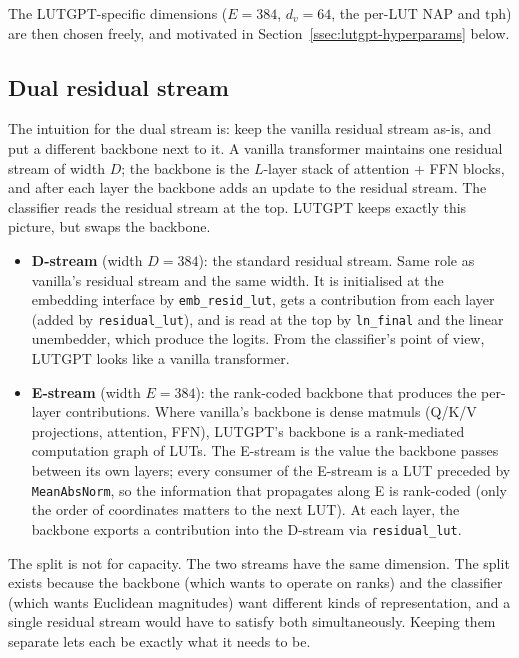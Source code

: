 \documentclass[11pt]{article}
\newcommand{\dv}{d_v}
\begin{document}
The LUTGPT-specific dimensions ($E = 384$, $\dv = 64$, the per-LUT NAP and $\mathrm{tph}$) are then chosen freely, and motivated in Section~\ref{ssec:lutgpt-hyperparams} below.

\subsection{Dual residual stream}
\label{ssec:dual-stream}

The intuition for the dual stream is: keep the vanilla residual stream as-is, and put a different backbone next to it. A vanilla transformer maintains one residual stream of width $D$; the backbone is the $L$-layer stack of attention + FFN blocks, and after each layer the backbone adds an update to the residual stream. The classifier reads the residual stream at the top. LUTGPT keeps exactly this picture, but swaps the backbone.

\begin{itemize}[leftmargin=*,topsep=2pt,itemsep=1pt]
\item \textbf{D-stream} (width $D = 384$): the standard residual stream. Same role as vanilla's residual stream and the same width. It is initialised at the embedding interface by \texttt{emb\_resid\_lut}, gets a contribution from each layer (added by \texttt{residual\_lut}), and is read at the top by \texttt{ln\_final} and the linear unembedder, which produce the logits. From the classifier's point of view, LUTGPT looks like a vanilla transformer.

\item \textbf{E-stream} (width $E = 384$): the rank-coded backbone that produces the per-layer contributions. Where vanilla's backbone is dense matmuls (Q/K/V projections, attention, FFN), LUTGPT's backbone is a rank-mediated computation graph of LUTs. The E-stream is the value the backbone passes between its own layers; every consumer of the E-stream is a LUT preceded by \texttt{MeanAbsNorm}, so the information that propagates along E is rank-coded (only the order of coordinates matters to the next LUT). At each layer, the backbone exports a contribution into the D-stream via \texttt{residual\_lut}.
\end{itemize}

The split is not for capacity. The two streams have the same dimension. The split exists because the backbone (which wants to operate on ranks) and the classifier (which wants Euclidean magnitudes) want different kinds of representation, and a single residual stream would have to satisfy both simultaneously. Keeping them separate lets each be exactly what it needs to be.
\end{document}
